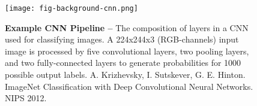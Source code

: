
\begin{figure}[h]

  \centering
  \texttt{[image: fig-background-cnn.png]}

  \caption{\textbf{Example CNN Pipeline --} The composition of layers in
    a CNN used for classifying images. A 224x244x3 (RGB-channels) input
    image is processed by five convolutional layers, two pooling layers,
    and two fully-connected layers to generate probabilities for 1000
    possible output labels. A. Krizhevsky, I. Sutskever,
    G. E. Hinton. ImageNet Classification with Deep Convolutional Neural
    Networks. NIPS 2012.}

  \label{fig-background-cnn}

\end{figure}
